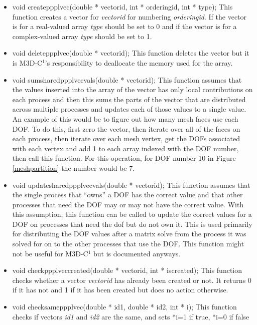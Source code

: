 \begin{itemize}
\item   void createppplvec(double * vectorid, int * orderingid, int * type); This function creates a vector 
for \textit{vectorid}
 for numbering \textit{orderingid}. If the vector is for a real-valued array \textit{type}
should be set to 0 and if the vector is for  a complex-valued array \textit{type} should be set to 1. 
\item   void deleteppplvec(double * vectorid); This function deletes the vector but it is M3D-C$^1$'s 
responsibility to deallocate the memory used for the array.
\item   void sumsharedppplvecvals(double * vectorid);  This function assumes that the values inserted into the
array of the vector has only local contributions on each process and then this sums the parts
of the vector that are distributed across multiple processes and updates each of those values
to a single value.  An example of this would be to figure out how many mesh faces use each DOF.  To do this, 
first zero the vector, then 
iterate over all of the faces on each process, then iterate over each mesh vertex, get the DOFs
associated with each vertex and add 1 to each array indexed with the DOF number, then call this function.
For this operation, for DOF number 10 in Figure \ref{meshpartition} the number would be 7.
\item   void updatesharedppplvecvals(double * vectorid);  This function assumes that the single process that ``owns'' a DOF
has the correct value and that other processes that need the DOF may or may not have the correct value.  With
this assumption, this function can be called to update the correct values for a DOF on processes
that need the dof but do not own it.  This is used primarily for distributing the DOF values after a matrix solve
from the process it was solved for on to the other processes that use the DOF.  This function might not be useful
for M3D-C$^1$ but is documented anyways.
\item   void checkppplveccreated(double * vectorid, int * iscreated); This function checks whether a vector \textit{vectorid} 
has already been created or not.  It returns 0 if it has not and 1 if it has been created but does no
action otherwise.  
\item void checksameppplvec(double * id1, double * id2, int * i); This function checks if vectors 
\textit{id1} and \textit{id2} are the same, and sets *i=1 if true, *i=0 if false
\end{itemize}


